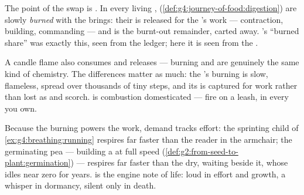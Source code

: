 \begin{proposition}\label{prop:g7:what-is-respiration:power}
The point of the swap is \emph{}. In every living
,  (\cref{def:g4:journey-of-food:digestion})
are slowly \emph{burned} with the  
brings: their  is released for the 's work ---
contraction, building, commanding --- and 
is the burnt-out remainder, carted away.
's ``burned share''
was exactly this, seen from the ledger; here it is seen
from the .
\end{proposition}
\admitted

\begin{example}\label{ex:g7:what-is-respiration:fire}
A candle flame also consumes  and releases  --- burning and  are genuinely the same
kind of chemistry. The differences matter as much: the
's burning is slow, flameless, spread over thousands of
tiny steps, and its  is captured for work rather than
lost as  and scorch.  is combustion
domesticated --- fire on a leash, in every  you own.
\end{example}

\begin{example}\label{ex:g7:what-is-respiration:demand}
Because the burning powers the work, demand tracks effort:
the sprinting child of \cref{ex:g4:breathing:running}
respires far faster than the reader in the armchair; the
germinating pea --- building a  at full speed
(\cref{def:g2:from-seed-to-plant:germination}) --- respires
far faster than the dry, waiting  beside it, whose
 idles near zero for years.  is the
engine note of life: loud in effort and growth, a whisper
in dormancy, silent only in death.
\end{example}

